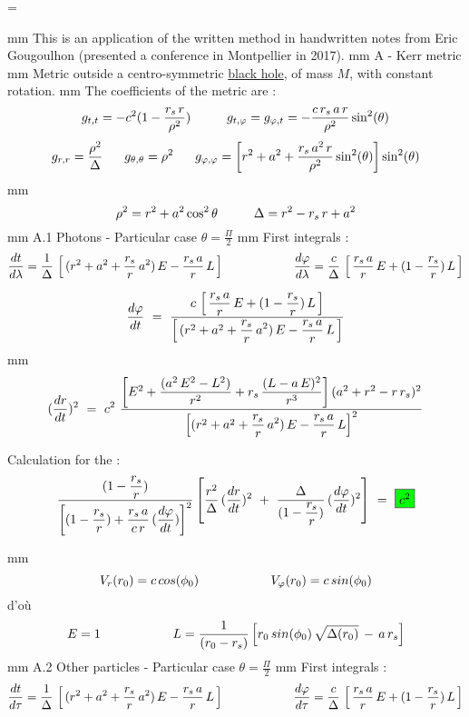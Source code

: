 \documentclass [12pt]{article}
\def\ph#1{\hskip #1}
\def\pv#1{\vskip #1}
\begin{document}
\centerline{ =   }
\pv 3mm
This is an application of the written method in handwritten notes from {\bidon Eric Gougoulhon} (presented a conference in Montpellier in 2017).
\pv 5mm
{\bidon A - Kerr metric} 
        \pv 3mm
				Metric outside a centro-symmetric \underline{black hole}, of mass $M$, with constant rotation.
\pv 2mm
				The coefficients of the metric are : 
				$$ \displaystyle g_{t,t}= -c^2(1-\frac{r_s\,r}{\rho^2})\ph 10mm g_{t,\varphi}=g_{\varphi,t}=-\frac{c\, r_s\, a\, r}{\rho^2}\sin^2(\theta)$$
			\pv -3mm	$$ g_{r,r}= \frac{\rho^2}{\Delta}   \ph 6mm g_{\theta,\theta}=\rho^2  \ph 6mm g_{\varphi,\varphi}=\left[r^2+a^2+\displaystyle\frac{r_s\, a^2\, r}{\rho^2}\sin^2(\theta)\right]\sin^2(\theta) $$
			\pv 2mm	$$\rho^2=r^2+a^2\cos^2\theta\ph 10mm\Delta=r^2-r_s\,r+a^2$$
								\pv 3mm
{\titre A.1  Photons - Particular case $\theta=\frac{\Pi}{2}$} 
\pv 3mm
First integrals :
$$\displaystyle{dt\over d\lambda}={1\over\Delta}\,\left[\,(r^2+a^2+{r_s\over r}\,a^2)\,E-{r_s\,a\over r}\,L\,\right]
\ph 20mm \displaystyle{d\varphi\over d\lambda} = {c\over\Delta}\,\left[\,{r_s\,a\over r}\,E+(1-{r_s\over r})\,L\,\right]$$

 $$\displaystyle {d\varphi\over dt}\ =\ \displaystyle\frac{c\,\left[\,\displaystyle{r_s\,a\over r}\,E+(1-\displaystyle{r_s\over r})\,L\,\right]}{\left[\,(r^2+a^2+\displaystyle{r_s\over r}\,a^2)\,E-\displaystyle{r_s\,a\over r}\,L\,\right]}$$
\pv 5mm
$$({dr \over dt})^2 \ =\ c^2\ \frac{\left[E^2+\displaystyle\frac{(a^2\,E^2-L^2)}{r^2}+r_s\,\displaystyle\frac{(L-a\,E)^2}{r^3}\right](a^2+r^2-r\,r_s)^2}{\left[(r^2+a^2+\displaystyle\frac{r_s}{r}\,a^2)\,E-\frac{r_s\,a}{r}\,L\right]^2  }$$ 

Calculation for the  :
$$ \frac{(1-\displaystyle\frac{r_s}{r})}{\left[ (1-\displaystyle\frac{r_s}{r}) + \displaystyle\frac{r_s\,a}{c\,r}\,({d\varphi\over dt}) \right]^2} \left[ \frac{r^2}{\Delta}\,({dr \over dt})^2 \ + \ \displaystyle\frac{\Delta}{(1-\displaystyle\frac{r_s}{r})}\,({d\varphi\over dt})^2 \right]\ =\ \fcolorbox{black}{green}{$c^2$} $$

\hypertarget{Kerrphoton}{}\pv 3mm
  $$V_r(r_0)=c\,cos(\phi_0) \ph 20mm  V_\varphi(r_0)=c\,sin(\phi_0)$$
  d'o\`u
  $$E=1   \ph 20mm L=\frac{1}{(r_0-r_s)}\left[r_0\,sin(\phi_0)\, \sqrt{\Delta(r_0)}\,-\,a\,r_s \right]   $$
\pv 5mm
{\titre A.2  Other particles - Particular case $\theta=\frac{\Pi}{2}$} 
\pv 3mm
First integrals :
$$\displaystyle{dt\over d\tau}={1\over\Delta}\,\left[\,(r^2+a^2+{r_s\over r}\,a^2)\,E-{r_s\,a\over r}\,L\,\right]
\ph 20mm \displaystyle{d\varphi\over d\tau} = {c\over\Delta}\,\left[\,{r_s\,a\over r}\,E+(1-{r_s\over r})\,L\,\right]$$
\end{document}
